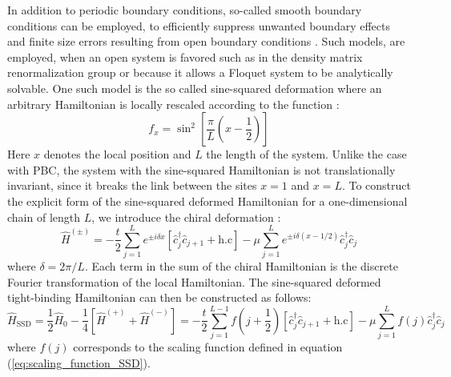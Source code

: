\documentclass[11pt, a4paper, oneside]{book}
\theoremstyle{definition} %
\begin{document}
In addition to periodic boundary conditions, so-called smooth boundary conditions can be employed, to efficiently suppress unwanted boundary effects and finite size errors resulting from open boundary conditions \cite{Hikihara}. Such models, are employed, when an open system is favored such as in the density matrix renormalization group or because it allows a Floquet system to be analytically solvable. One such model is the so called sine-squared deformation where an arbitrary Hamiltonian is locally rescaled according to the function \cite{Katsura2}:
\begin{equation}
	f_x = \sin^2\left[\frac{\pi}{L} \left(x -\frac{1}{2} \right)\right]
	\label{eq:scaling_function_SSD}
\end{equation}
Here $x$ denotes the local position and $L$ the length of the system. Unlike the case with PBC, the system with the sine-squared Hamiltonian is not translationally invariant, since it breaks the link between the sites $x=1$ and $x=L$. To construct the explicit form of the sine-squared deformed Hamiltonian for a one-dimensional chain of length $L$, we introduce the chiral deformation \cite{Maruyama, Katsura2}:
\begin{equation}
	\hat{H}^{(\pm)} = - \frac{t}{2} \sum_{j=1}^L e^{\pm i \delta x} [\hat{c}_j^\dagger \hat{c}_{j+1} + \text{h.c}] - \mu \sum_{j=1}^L e^{\pm i \delta(x - 1/2)} \hat{c}^\dagger_j \hat{c}_j
\end{equation}
where $\delta = 2\pi/L$. Each term in the sum of the chiral Hamiltonian is the discrete Fourier transformation of the local Hamiltonian. The sine-squared deformed tight-binding Hamiltonian can then be constructed as follows:
\begin{equation}
	\hat{H}_{\text{SSD}} = \frac{1}{2} \hat{H}_0 - \frac{1}{4} \left[\hat{H}^{(+)} + \hat{H}^{(-)}\right] = -\frac{t}{2} \sum_{j=1}^{L-1} f\left(j + \frac{1}{2}\right)[\hat{c}^\dagger_j \hat{c}_{j+1} + \text{h.c}] - \mu \sum_{j=1}^L f(j) \hat{c}_j^\dagger \hat{c}_j
	\label{eq:SSD_Hamiltonian_chiral}
\end{equation}
where $f(j)$ corresponds to the scaling function defined in equation (\ref{eq:scaling_function_SSD}). \\
\end{document}
